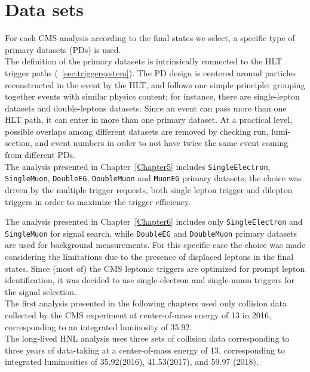 \section{Data sets}\label{sec:c4data}

For each CMS analysis according to the final states we 
select, a specific type of primary datasets (PDs) is used.\\
The definition of the primary datasets is intrinsically connected to
the HLT trigger paths (~\ref{sec:triggersystem}). The PD design is centered
around particles reconstructed in the event by the HLT, and follows one simple principle:
grouping together events with similar physics content; for instance, there are
single-lepton datasets and double-leptons datasets.
Since an event can pass more than one HLT path,
it can enter in more than one primary dataset. At a practical level, possible overlaps among different datasets are
removed by checking run, lumi-section, and event numbers in order to not have twice the same event coming from different PDs.\\


The analysis presented in Chapter~\ref{Chapter5} includes
\texttt{SingleElectron}, \texttt{SingleMuon}, \texttt{DoubleEG},
\texttt{DoubleMuon} and \texttt{MuonEG} primary datasets; the choice was driven by the
multiple trigger requests, both single lepton trigger and
dilepton triggers in order to maximize the trigger efficiency.

The analysis presented in Chapter~\ref{Chapter6} includes only
\texttt{SingleElectron} and \texttt{SingleMuon} for signal search,
while \texttt{DoubleEG} and
\texttt{DoubleMuon} primary datasets are used for background
measurements. For this specific case the choice was
made considering the limitations due to the presence of displaced
leptons in the final states.
Since (most of) the CMS leptonic triggers are
optimized for prompt lepton identification, it was decided
to use single-electron and single-muon triggers for the
signal selection.\\

The first analysis presented in the following chapters used only 
\Pp collision data collected
by the CMS experiment at center-of-mass energy of 13\TeV
in 2016, corresponding to an integrated luminosity of 35.92\fbinv.\\

The long-lived HNL analysis uses three sets of \Pp collision data
corresponding to three years of data-taking at a
center-of-mass energy of 13\TeV, corresponding to integrated
luminosities of 35.92\fbinv (2016), 41.53\fbinv (2017), and 59.97\fbinv
(2018). 

